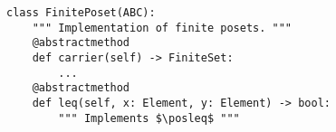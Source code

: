 \par\begin{minipage}{60ex}
\begin{verbatim}
class FinitePoset(ABC):
    """ Implementation of finite posets. """
    @abstractmethod
    def carrier(self) -> FiniteSet:
        ...
    @abstractmethod
    def leq(self, x: Element, y: Element) -> bool:
        """ Implements $\posleq$ """
\end{verbatim}
\end{minipage}\par